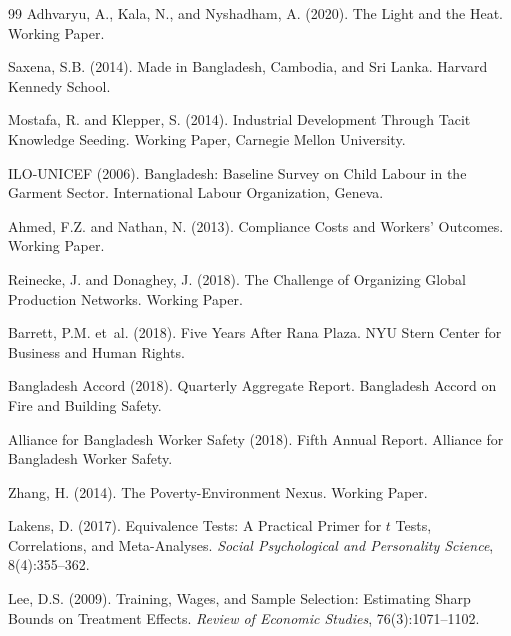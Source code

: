 \documentclass[12pt]{article}
\begin{document}
\begin{thebibliography}{99}
Adhvaryu, A., Kala, N., and Nyshadham, A. (2020).
\newblock The Light and the Heat.
\newblock Working Paper.

Saxena, S.B. (2014).
\newblock Made in Bangladesh, Cambodia, and Sri Lanka.
\newblock Harvard Kennedy School.

Mostafa, R. and Klepper, S. (2014).
\newblock Industrial Development Through Tacit Knowledge Seeding.
\newblock Working Paper, Carnegie Mellon University.

ILO-UNICEF (2006).
\newblock Bangladesh: Baseline Survey on Child Labour in the Garment Sector.
\newblock International Labour Organization, Geneva.

Ahmed, F.Z. and Nathan, N. (2013).
\newblock Compliance Costs and Workers' Outcomes.
\newblock Working Paper.

Reinecke, J. and Donaghey, J. (2018).
\newblock The Challenge of Organizing Global Production Networks.
\newblock Working Paper.

Barrett, P.M. et~al. (2018).
\newblock Five Years After Rana Plaza.
\newblock NYU Stern Center for Business and Human Rights.

Bangladesh Accord (2018).
\newblock Quarterly Aggregate Report.
\newblock Bangladesh Accord on Fire and Building Safety.

Alliance for Bangladesh Worker Safety (2018).
\newblock Fifth Annual Report.
\newblock Alliance for Bangladesh Worker Safety.

Zhang, H. (2014).
\newblock The Poverty-Environment Nexus.
\newblock Working Paper.

Lakens, D. (2017).
\newblock Equivalence Tests: A Practical Primer for $t$ Tests, Correlations, and Meta-Analyses.
\newblock \textit{Social Psychological and Personality Science}, 8(4):355--362.

Lee, D.S. (2009).
\newblock Training, Wages, and Sample Selection: Estimating Sharp Bounds on Treatment Effects.
\newblock \textit{Review of Economic Studies}, 76(3):1071--1102.

\end{thebibliography}
\end{document}
